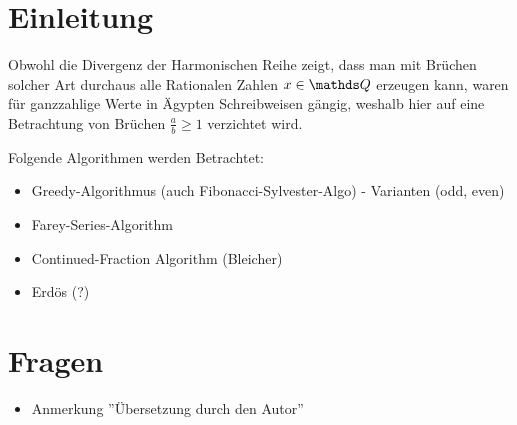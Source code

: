 \section{Einleitung}

Obwohl die Divergenz der Harmonischen Reihe zeigt, dass man mit Brüchen solcher Art durchaus alle Rationalen Zahlen $x \in \Q$ erzeugen kann, waren für ganzzahlige Werte in Ägypten Schreibweisen gängig, weshalb hier auf eine Betrachtung von Brüchen $\frac{a}{b} \geq 1$ verzichtet wird.

Folgende Algorithmen werden Betrachtet:
\begin{itemize}
	\item Greedy-Algorithmus (auch Fibonacci-Sylvester-Algo)
		\subitem - Varianten (odd, even)
	\item Farey-Series-Algorithm
	\item Continued-Fraction Algorithm (Bleicher)
	\item Erdös (?)
\end{itemize}

\section*{Fragen}
\begin{itemize}
	\item Anmerkung ''Übersetzung durch den Autor''
\end{itemize}